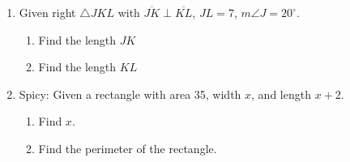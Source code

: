 \begin{enumerate}
\item Given right $\triangle JKL$ with $\overline{JK} \perp \overline{KL}$, $JL=7$, $m\angle J=20^\circ$.
  \begin{center}
     \vspace{1cm}
  \end{center}
  \begin{enumerate}
    \item Find the length $JK$\\[3cm]
    \item Find the length $KL$\\[2cm]
  \end{enumerate}

\item Spicy: Given a rectangle with area 35, width $x$, and length $x+2$.
  \begin{enumerate}
    \item Find $x$.\\[4cm]
    \item Find the perimeter of the rectangle.
  \end{enumerate}


\end{enumerate}

